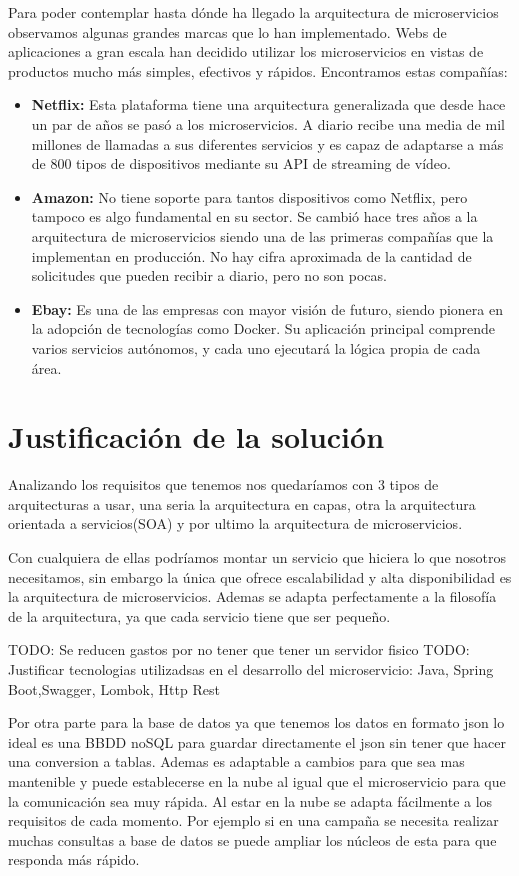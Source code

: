 \documentclass[12pt]{report} %
\begin{document}
Para poder contemplar hasta dónde ha llegado la arquitectura de microservicios observamos algunas grandes marcas que lo han implementado. Webs de aplicaciones a gran escala han decidido utilizar los microservicios en vistas de productos mucho más simples, efectivos y rápidos. Encontramos estas compañías:
\begin{itemize}
	\item \textbf{Netflix:} Esta plataforma tiene una arquitectura generalizada que desde hace un par de años se pasó a los microservicios. A diario recibe una media de mil millones de llamadas a sus diferentes servicios y es capaz de adaptarse a más de 800 tipos de dispositivos mediante su API de streaming de vídeo.
	\item \textbf{Amazon:} No tiene soporte para tantos dispositivos como Netflix, pero tampoco es algo fundamental en su sector. Se cambió hace tres años a la arquitectura de microservicios siendo una de las primeras compañías que la implementan en producción. No hay cifra aproximada de la cantidad de solicitudes que pueden recibir a diario, pero no son pocas. 
	\item \textbf{Ebay:} Es una de las empresas con mayor visión de futuro, siendo pionera en la adopción de tecnologías como Docker. Su aplicación principal comprende varios servicios autónomos, y cada uno ejecutará la lógica propia de cada área.
\end{itemize}


\chapter{Justificación de la solución}

Analizando los requisitos que tenemos nos quedaríamos con 3 tipos de arquitecturas a usar, una seria la arquitectura en capas, otra la arquitectura orientada a servicios(SOA) y por ultimo la arquitectura de microservicios. 

Con cualquiera de ellas podríamos montar un servicio que hiciera lo que nosotros necesitamos, sin embargo la única que ofrece escalabilidad y alta disponibilidad es la arquitectura de microservicios. Ademas se adapta perfectamente a la filosofía de la arquitectura, ya que cada servicio tiene que ser pequeño.

TODO: Se reducen gastos por no tener que tener un servidor fisico
TODO: Justificar tecnologias utilizadsas en el desarrollo del microservicio: Java, Spring Boot,Swagger, Lombok, Http Rest

Por otra parte para la base de datos ya que tenemos los datos en formato json lo ideal es una BBDD noSQL para guardar directamente el json sin tener que hacer una conversion a tablas. Ademas es adaptable a cambios para que sea mas mantenible y puede establecerse en la nube al igual que el microservicio para que la comunicación sea muy rápida. Al estar en la nube se adapta fácilmente a los requisitos de cada momento. Por ejemplo si en una campaña se necesita realizar muchas consultas a base de datos se puede ampliar los núcleos de esta para que responda más rápido.
\end{document}
